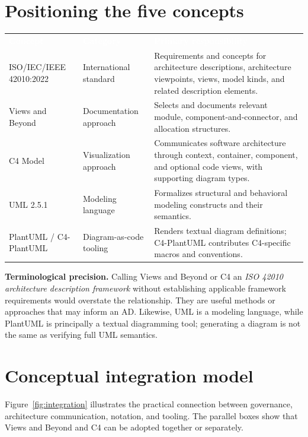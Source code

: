 \documentclass[11pt,letterpaper,oneside]{article}
\newcommand{\thead}[1]{\textcolor{white}{\bfseries #1}}
\begin{document}
\section{Positioning the five concepts}\label{sec:landscape}
\small
{}
\begin{tabularx}{\textwidth}{@{}L{0.22\textwidth}L{0.20\textwidth}Y@{}}
\thead{Concept} & \thead{Category} & \thead{Primary responsibility}\\
ISO/IEC/IEEE 42010:2022 & International standard & Requirements and concepts for architecture descriptions, architecture viewpoints, views, model kinds, and related description elements.\\
Views and Beyond & Documentation approach & Selects and documents relevant module, component-and-connector, and allocation structures.\\
C4 Model & Visualization approach & Communicates software architecture through context, container, component, and optional code views, with supporting diagram types.\\
UML 2.5.1 & Modeling language & Formalizes structural and behavioral modeling constructs and their semantics.\\
PlantUML / C4-PlantUML & Diagram-as-code tooling & Renders textual diagram definitions; C4-PlantUML contributes C4-specific macros and conventions.\\
\end{tabularx}
\normalsize
\vspace{0.13in}
\begin{notebox}
\textbf{Terminological precision.} Calling Views and Beyond or C4 an \emph{ISO 42010 architecture description framework} without establishing applicable framework requirements would overstate the relationship. They are useful methods or approaches that may inform an AD. Likewise, UML is a modeling language, while PlantUML is principally a textual diagramming tool; generating a diagram is not the same as verifying full UML semantics.
\end{notebox}

\section{Conceptual integration model}\label{sec:model}
Figure~\ref{fig:integration} illustrates the practical connection between governance, architecture communication, notation, and tooling. The parallel boxes show that Views and Beyond and C4 can be adopted together or separately.
\end{document}
